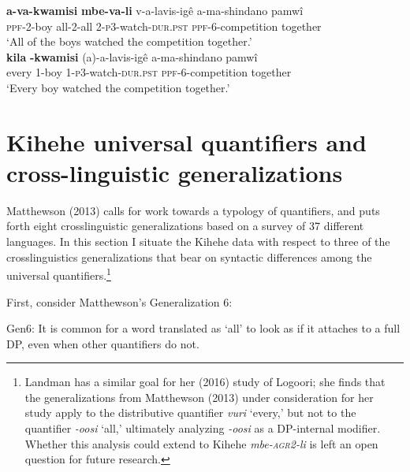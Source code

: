 \documentclass[output=paper,modfonts,nonflat]{langsci/langscibook}
\begin{document}
\begin{exe}

\ex  \label{ex:kaspercushman:competition} \begin{xlist}

\ex 
\gll \textbf{a-va-kwamisi} \textbf{mbe-va-li} v-a-lavis-ig\^e a-ma-shindano pamw\^i \\
\textsc{ppf}-2-boy all-2-all 2-\textsc{p3}-watch-\textsc{dur.pst} \textsc{ppf}-6-competition together\\
\glt `All of the boys watched the competition together.'\\



\ex \label{ex:kaspercushman:everytogether} 
\gll * \textbf{kila} \textbf{-kwamisi} (a)-a-lavis-ig\^e a-ma-shindano pamw\^i \\
{} every 1-boy 1-\textsc{p3}-watch-\textsc{dur.pst} \textsc{ppf}-6-competition together \\
\glt `Every boy watched the competition together.'

\end{xlist}
\end{exe}

 

\section{Kihehe universal quantifiers and cross-linguistic generalizations}\label{sec:kaspercushman:5}  \label{ex:kaspercushman:type}

Matthewson (2013) calls for work towards a typology of quantifiers, and puts forth eight crosslinguistic generalizations based on a survey of 37 different languages. In this section I situate the Kihehe data with respect to three of the crosslinguistics generalizations that bear on syntactic differences among the universal quantifiers.\footnote{Landman has a similar goal for her (2016) study of Logoori; she finds that the generalizations from Matthewson (2013) under consideration for her study apply to the distributive quantifier \textit{vuri} `every,' but not to the quantifier \textit{-oosi} `all,' ultimately analyzing \textit{-oosi} as a DP-internal modifier. Whether this analysis could extend to Kihehe \textit{mbe-\textsc{agr2}-li} is left an open question for future research.}  



First, consider Matthewson's Generalization 6:

\begin{exe}

\ex Gen6: It is common for a word translated as `all' to look as if it attaches to a full DP, even when other quantifiers do not. \cite[35]{matthewson13} \\
\end{exe}
\end{document}
